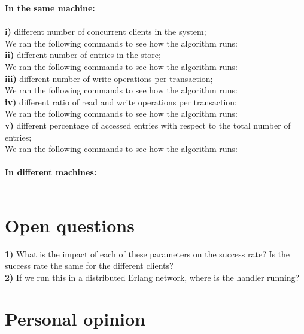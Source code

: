 \documentclass[a4paper, 11pt]{article}
\begin{document}
\textbf{In the same machine:}\\\\
\textbf{i)} different number of concurrent clients in the system;\\
We ran the following commands to see how the algorithm runs:\\
%
\textbf{ii)} different number of entries in the store;\\
We ran the following commands to see how the algorithm runs:\\
%
\textbf{iii)} different number of write operations per transaction;\\
We ran the following commands to see how the algorithm runs:\\
%
\textbf{iv)} different ratio of read and write operations per transaction;\\
We ran the following commands to see how the algorithm runs:\\
%
\textbf{v)} different percentage of accessed entries with respect to the total number of entries;\\
We ran the following commands to see how the algorithm runs:\\\\

\textbf{In different machines:}\\\\


\section{Open questions}

\textbf{1)} What is the impact of each of these parameters on the success rate? Is the success rate the same for the different clients?\\
\textbf{2)} If we run this in a distributed Erlang network, where is the handler running?\\


\section{Personal opinion}
\end{document}
